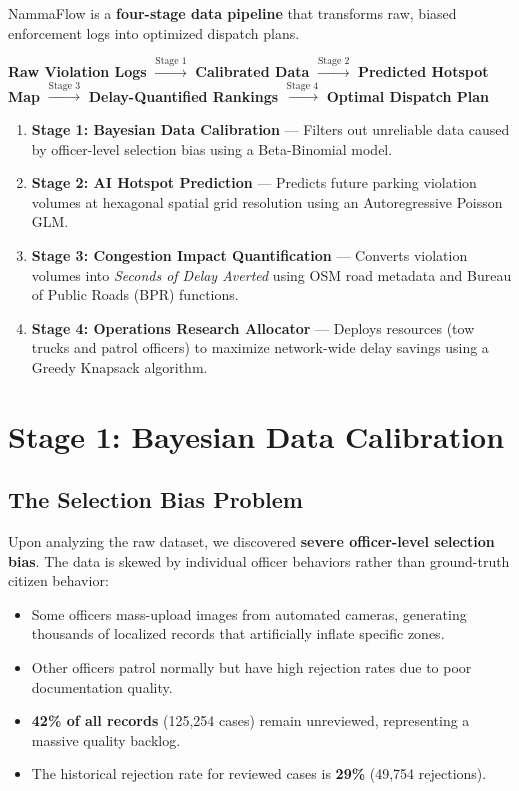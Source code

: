\documentclass[12pt,a4paper]{article}
\begin{document}
NammaFlow is a \textbf{four-stage data pipeline} that transforms raw, biased enforcement logs into optimized dispatch plans.

\begin{tcolorbox}[keybox, title={NammaFlow Pipeline Overview}]
\begin{center}
\textbf{Raw Violation Logs} $\xrightarrow{\text{Stage 1}}$ \textbf{Calibrated Data} $\xrightarrow{\text{Stage 2}}$ \textbf{Predicted Hotspot Map} $\xrightarrow{\text{Stage 3}}$ \textbf{Delay-Quantified Rankings} $\xrightarrow{\text{Stage 4}}$ \textbf{Optimal Dispatch Plan}
\end{center}

\begin{enumerate}[leftmargin=2em, itemsep=4pt]
    \item \textbf{Stage 1: Bayesian Data Calibration} — Filters out unreliable data caused by officer-level selection bias using a Beta-Binomial model.
    \item \textbf{Stage 2: AI Hotspot Prediction} — Predicts future parking violation volumes at hexagonal spatial grid resolution using an Autoregressive Poisson GLM.
    \item \textbf{Stage 3: Congestion Impact Quantification} — Converts violation volumes into \emph{Seconds of Delay Averted} using OSM road metadata and Bureau of Public Roads (BPR) functions.
    \item \textbf{Stage 4: Operations Research Allocator} — Deploys resources (tow trucks and patrol officers) to maximize network-wide delay savings using a Greedy Knapsack algorithm.
\end{enumerate}
\end{tcolorbox}

\section{Stage 1: Bayesian Data Calibration}

\subsection{The Selection Bias Problem}

Upon analyzing the raw dataset, we discovered \textbf{severe officer-level selection bias}. The data is skewed by individual officer behaviors rather than ground-truth citizen behavior:
\begin{itemize}
    \item Some officers mass-upload images from automated cameras, generating thousands of localized records that artificially inflate specific zones.
    \item Other officers patrol normally but have high rejection rates due to poor documentation quality.
    \item \textbf{42\% of all records} (125,254 cases) remain unreviewed, representing a massive quality backlog.
    \item The historical rejection rate for reviewed cases is \textbf{29\%} (49,754 rejections).
\end{itemize}
\end{document}
